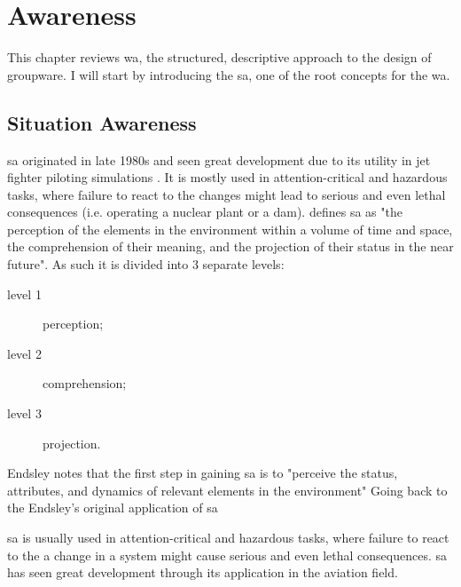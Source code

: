 
\chapter{Awareness}

This chapter reviews \gls{wa}, the structured, descriptive approach to the design of groupware. I will start by introducing the \gls{sa}, one of the root concepts for the \gls{wa}.





\section{Situation Awareness}


\gls{sa} originated in late 1980s and seen great development  due to its utility in jet fighter piloting simulations \cite{endsley_situation_1988}. It is mostly used in attention-critical and hazardous tasks, where failure to react to the changes might lead to serious and even lethal consequences (i.e. operating a nuclear plant or a dam).
\cite{endsley_design_1988} defines \gls{sa} as "the perception of the elements in the environment within a volume of time and space, the comprehension of their meaning, and the projection of their status in the near future". As such it is divided into 3 separate levels:
\begin{description}
	\item[level 1] perception;
	\item[level 2] comprehension;
	\item[level 3] projection.
\end{description}
Endsley notes that the first step in gaining \gls{sa} is to "perceive the status, attributes, and dynamics of relevant elements in the environment" \cite{} Going back to the Endsley's original application of \gls{sa}


\gls{sa} is usually used in attention-critical and hazardous tasks, where failure to react to the a change in a system might cause serious and even lethal consequences.
\gls{sa} has seen great development through its application in the aviation field.

